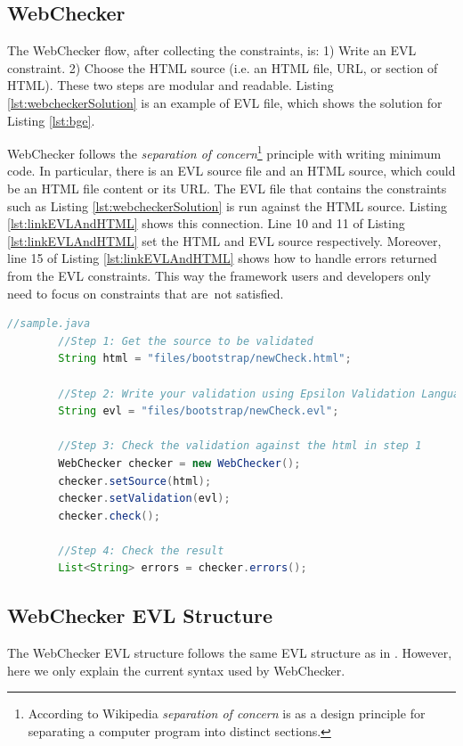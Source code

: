 \documentclass[conference]{IEEETran}
\begin{document}
\subsection{WebChecker}
The WebChecker flow, after collecting the constraints, is: 
1) Write an EVL constraint.
2) Choose the HTML source (i.e. an HTML file, URL, or section of HTML).
These two steps are modular and readable. Listing \ref{lst:webcheckerSolution} is an example of EVL file, which shows the solution for Listing \ref{lst:bge}. 

WebChecker follows the \textit{separation of concern}\footnote{According to Wikipedia \textit{separation of concern} is as a design principle for separating a computer program into distinct sections.} principle with writing minimum code. In particular, there is an EVL source file and an HTML source, which could be an HTML file content or its URL. The EVL file that contains the constraints such as Listing \ref{lst:webcheckerSolution} is run against the HTML source. Listing \ref{lst:linkEVLAndHTML} shows this connection. Line 10 and 11 of Listing \ref{lst:linkEVLAndHTML} set the HTML and EVL source respectively. Moreover, line 15 of Listing \ref{lst:linkEVLAndHTML} shows how to handle errors returned from the EVL constraints. This way the framework users and developers only need to focus on constraints that are not satisfied.   

\begin{minipage}{\linewidth}
\begin{lstlisting}[language=Java, caption=Checking an EVL file against an HTML source file, label={lst:linkEVLAndHTML}]
 	//sample.java    
		//Step 1: Get the source to be validated
		String html = "files/bootstrap/newCheck.html";
		
		//Step 2: Write your validation using Epsilon Validation Language
		String evl = "files/bootstrap/newCheck.evl";
		
		//Step 3: Check the validation against the html in step 1
		WebChecker checker = new WebChecker();
		checker.setSource(html);
		checker.setValidation(evl);
		checker.check();
		
		//Step 4: Check the result
		List<String> errors = checker.errors();


\end{lstlisting}
\end{minipage}

\subsection{WebChecker EVL Structure}
The WebChecker EVL structure follows the same EVL structure as in \cite{Kolovos2009}. However, here we only explain the current syntax used by WebChecker. 
\end{document}
